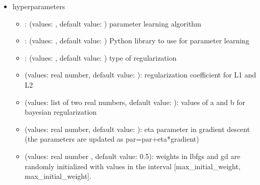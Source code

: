 \documentclass[letterpaper,10pt,english]{sphinxmanual}
\begin{document}
\begin{sphinxVerbatim}[commandchars=\\\{\}]
 
\end{sphinxVerbatim}
\begin{itemize}
\item {} 
\sphinxAtStartPar
hyper\sphinxhyphen{}parameters
\begin{itemize}
\item {} 
\sphinxAtStartPar
{}: (values: , default value: ) parameter learning algorithm

\item {} 
\sphinxAtStartPar
{}: (values: , default value: ) Python library to use for parameter learning

\item {} 
\sphinxAtStartPar
{}: (values: , default value: ) type of regularization

\item {} 
\sphinxAtStartPar
{} (values: real number, default value: ): regularization coefficient for L1 and L2

\item {} 
\sphinxAtStartPar
{} (values: list of two real numbers, default value: \sphinxcode{\sphinxupquote{{[}0,10{]}}}): values of a and b for bayesian regularization

\item {} 
\sphinxAtStartPar
{} (values: real number, default value: ): eta parameter in gradient descent (the parameters are updated as par=par+eta*gradient)

\item {} 
\sphinxAtStartPar
{} (values: real number , default value: 0.5): weights in lbfgs and gd are randomly initialized with values in the interval {[}\sphinxhyphen{}max\_initial\_weight, max\_initial\_weight{]}.


\end{itemize}
\end{itemize}
\end{document}
